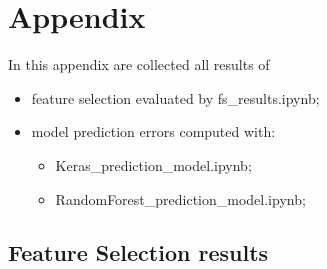 \chapter{Appendix}
\label{chap:appendix}
In this appendix are collected all results of
\begin{itemize}
    \item feature selection evaluated by fs\_results.ipynb;
    \item model prediction errors computed with:
    \begin{itemize}
        \item Keras\_prediction\_model.ipynb;
        \item RandomForest\_prediction\_model.ipynb;
    \end{itemize}  
\end{itemize}
\section{Feature Selection results}
